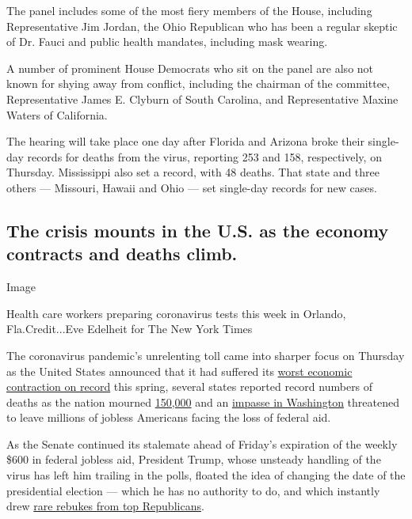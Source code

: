 The panel includes some of the most fiery members of the House,
including Representative Jim Jordan, the Ohio Republican who has been a
regular skeptic of Dr. Fauci and public health mandates, including mask
wearing.

A number of prominent House Democrats who sit on the panel are also not
known for shying away from conflict, including the chairman of the
committee, Representative James E. Clyburn of South Carolina, and
Representative Maxine Waters of California.

The hearing will take place one day after Florida and Arizona broke
their single-day records for deaths from the virus, reporting 253 and
158, respectively, on Thursday. Mississippi also set a record, with 48
deaths. That state and three others --- Missouri, Hawaii and Ohio ---
set single-day records for new cases.

\hypertarget{the-crisis-mounts-in-the-us-as-the-economy-contracts-and-deaths-climb}{%
\subsection{The crisis mounts in the U.S. as the economy contracts and
deaths
climb.}\label{the-crisis-mounts-in-the-us-as-the-economy-contracts-and-deaths-climb}}

Image

Health care workers preparing coronavirus tests this week in Orlando,
Fla.Credit...Eve Edelheit for The New York Times

The coronavirus pandemic's unrelenting toll came into sharper focus on
Thursday as the United States announced that it had suffered its
\href{https://www.nytimes.com/live/2020/07/30/business/stock-market-today-coronavirus?action=click\&module=Top\%20Stories\&pgtype=Homepage}{worst
economic contraction on record} this spring, several states reported
record numbers of deaths as the nation mourned
\href{https://www.nytimes.com/2020/07/29/us/coronavirus-deaths-150000.html}{150,000}
and an
\href{https://www.nytimes.com/interactive/2020/07/30/upshot/coronavirus-stimulus-bill.html}{impasse
in Washington} threatened to leave millions of jobless Americans facing
the loss of federal aid.

As the Senate continued its stalemate ahead of Friday's expiration of
the weekly \$600 in federal jobless aid, President Trump, whose unsteady
handling of the virus has left him trailing in the polls, floated the
idea of changing the date of the presidential election --- which he has
no authority to do, and which instantly drew
\href{https://www.nytimes.com/2020/07/30/us/elections/biden-vs-trump.html?action=click\&module=Top\%20Stories\&pgtype=Homepage}{rare
rebukes from top Republicans}.

